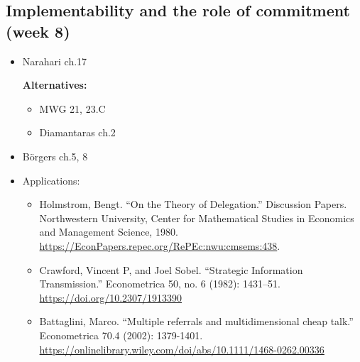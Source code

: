 \documentclass{article}
\begin{document}
\subsection{Implementability and the role of commitment (week 8)}
\begin{itemize}
	\item Narahari ch.17
	
	\textbf{Alternatives:}
	\begin{itemize}
		\item MWG 21, 23.C
		\item Diamantaras ch.2
	\end{itemize}

	\item B{\"o}rgers ch.5, 8

	\item Applications:
	\begin{itemize}
		\item Holmstrom, Bengt. ``On the Theory of Delegation.'' Discussion Papers. Northwestern University, Center for Mathematical Studies in Economics and Management Science, 1980.\\ \url{https://EconPapers.repec.org/RePEc:nwu:cmsems:438}.
		\item Crawford, Vincent P, and Joel Sobel. ``Strategic Information Transmission.'' Econometrica 50, no. 6 (1982): 1431–51. \url{https://doi.org/10.2307/1913390}
		\item Battaglini, Marco. ``Multiple referrals and multidimensional cheap talk.'' Econometrica 70.4 (2002): 1379-1401.\\ \url{https://onlinelibrary.wiley.com/doi/abs/10.1111/1468-0262.00336}
	\end{itemize}

\end{itemize}
\end{document}
